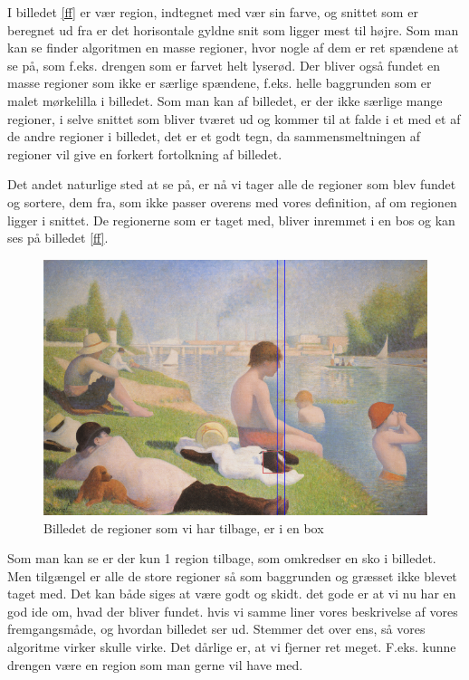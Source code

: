 I billedet \ref{ff} er vær region, indtegnet med vær sin farve, og snittet
som er beregnet ud fra er det horisontale gyldne snit som ligger mest
til højre. Som man kan se finder algoritmen en masse regioner, hvor
nogle af dem er ret spændene at se på, som f.eks. drengen som er farvet
helt lyserød. Der bliver også fundet en masse regioner som ikke er
særlige spændene, f.eks. helle baggrunden som er malet mørkelilla i
billedet. Som man kan af billedet, er der ikke særlige mange regioner, i
selve snittet som bliver tværet ud og kommer til at falde i et med et af
de andre regioner i billedet, det er et godt tegn, da sammensmeltningen af
regioner vil give en forkert fortolkning af billedet.

Det andet naturlige sted at se på, er nå vi tager alle de regioner som
blev fundet og sortere, dem fra, som ikke passer overens med vores
definition, af om regionen ligger i snittet. De regionerne som er taget
med, bliver inremmet i en bos og kan ses på billedet \ref{ff}. 

\begin{figure}[h!!]
	\begin{center}
		\includegraphics[scale=0.42,angle=0]{afsnit/afprovning/billeder/boindingboxbilledet.png}
	\end{center}
	\caption[]{Billedet de regioner som vi har tilbage, er i en box}
	\label{blob}
\end{figure}

Som man kan se er der kun 1 region tilbage, som omkredser en sko i
billedet. Men tilgængel er alle de store regioner så som baggrunden og
græsset ikke blevet taget med. Det kan både siges at være godt og skidt.
det gode er at vi nu har en god ide om, hvad der bliver fundet. hvis vi
samme liner vores beskrivelse af vores fremgangsmåde, og hvordan
billedet ser ud. Stemmer det over ens, så vores algoritme virker skulle virke. Det
dårlige er, at vi fjerner ret meget. F.eks. kunne drengen være en
region som man gerne vil have med.

